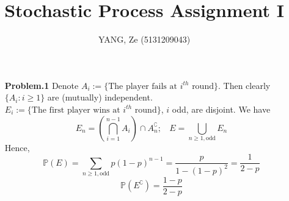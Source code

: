 \documentclass[a4paper, 11pt]{article}
\title{\textbf{Stochastic Process Assignment I}}
\author{YANG, Ze (5131209043)}
\begin{document}
\maketitle
\begin{itemize}
	\item[\textbf{Problem.1}] Denote $A_i:=\{\text{The player fails at $i^{th}$ round}\}$. Then clearly $\{A_i: i\geq 1\}$ are (mutually) independent. $E_i:=\{\text{The first player wins at $i^{th}$ round}\}$, $i$ odd, are disjoint. We have
	$$E_n = \left(\bigcap_{i=1}^{n-1}A_i\right) \cap A_n^{\complement};~~~~E=\bigcup_{n\geq 1, \text{odd}}E_n$$
	Hence,
	$$\mathbb{P}\left(E\right)=\sum_{n\geq 1, \text{odd}}p(1-p)^{n-1}=\frac{p}{1-(1-p)^2}=\frac{1}{2-p}$$
	$$\mathbb{P}\left(E^{\complement}\right)=\frac{1-p}{2-p}$$
\end{itemize}
\end{document}

